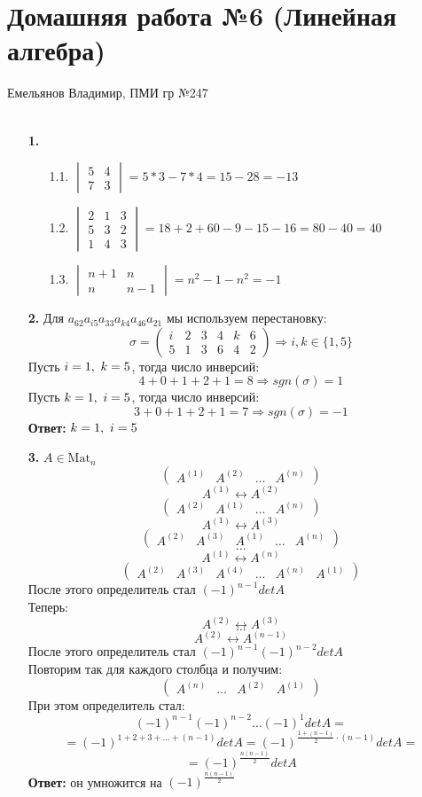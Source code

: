 \documentclass[a4paper]{article}
\newcommand{\mat}[1]{\begin{pmatrix} #1 \end{pmatrix}}
\renewcommand{\det}[1]{\begin{vmatrix} #1 \end{vmatrix}}
\renewcommand{\f}[2]{\frac{#1}{#2}}
\newcommand{\ts}{\text{\space}}
\renewcommand{\r}{\Rightarrow}
\begin{document}
\section*{Домашняя работа №6 (Линейная алгебра)}
{\large Емельянов Владимир, ПМИ гр №247}\\\\
\begin{enumerate}
    \item[\textbf{1.}]
    \begin{enumerate}
        \item[1.1.] $\det{5 & 4 \\ 7 & 3} = 5*3 - 7*4 = 15 - 28 = -13$
        \item[1.2.] $\det{2 & 1 &  3 \\ 5 & 3 & 2 \\ 1 & 4 & 3} = 18 + 2 + 60 - 9 - 15-16 = 80 - 40 = 40$
        \item[1.3.] $\det{n+1 & n \\ n & n-1} = n^2-1-n^2 = -1$
    \end{enumerate}

    \item[\textbf{2.}] Для $a_{62}a_{i5}a_{33}a_{k4}a_{46}a_{21}$ мы используем перестановку:
    $$\sigma = \mat{i & 2 & 3 & 4 & k & 6 \\ 5 & 1 & 3 & 6 & 4 & 2} \r i,k \in \{1, 5\}$$
    Пусть $i=1, \ts k = 5$, тогда число инверсий:
    $$4+ 0 + 1 + 2 + 1 = 8 \r sgn(\sigma) = 1$$
    Пусть $k=1, \ts i = 5$, тогда число инверсий:
    $$3+ 0 + 1 + 2 + 1 = 7 \r sgn(\sigma) = -1$$
    \textbf{Ответ: } $k = 1, \ts i = 5$
    
    \item[\textbf{3.}]$A \in \text{Mat}_n$
    $$\mat{A^{(1)} & A^{(2)} & \dots & A^{(n)}}$$
    $$A^{(1)} \leftrightarrow A^{(2)}$$
    $$\mat{A^{(2)} & A^{(1)} & \dots & A^{(n)}}$$
    $$A^{(1)} \leftrightarrow A^{(3)}$$
    $$\mat{A^{(2)} & A^{(3)} & A^{(1)} & \dots & A^{(n)}}$$
    $$\dots$$
    $$A^{(1)} \leftrightarrow A^{(n)}$$
    $$\mat{A^{(2)} & A^{(3)} & A^{(4)} & \dots & A^{(n)} & A^{(1)}}$$
    После этого определитель стал $(-1)^{n-1}detA$\\
    Теперь:
    $$A^{(2)} \leftrightarrow A^{(3)}$$
    $$\dots$$
    $$A^{(2)} \leftrightarrow A^{(n-1)}$$
    После этого определитель стал $(-1)^{n-1}(-1)^{n-2}detA$\\
    Повторим так для каждого столбца и получим:
    $$\mat{A^{(n)} & \dots & A^{(2)} &A^{(1)}}$$
    При этом определитель стал:
    $$(-1)^{n-1}(-1)^{n-2}\dots(-1)^1detA =$$
    $$= (-1)^{1 + 2 + 3 + \dots + (n-1)}detA = (-1)^{\f{1+(n-1)}{2}\cdot(n-1)}detA = $$
    $$=(-1)^{\f{n(n-1)}{2}}detA$$
    \textbf{Ответ: } он умножится на $(-1)^{\f{n(n-1)}{2}}$


\end{enumerate}
\end{document}
